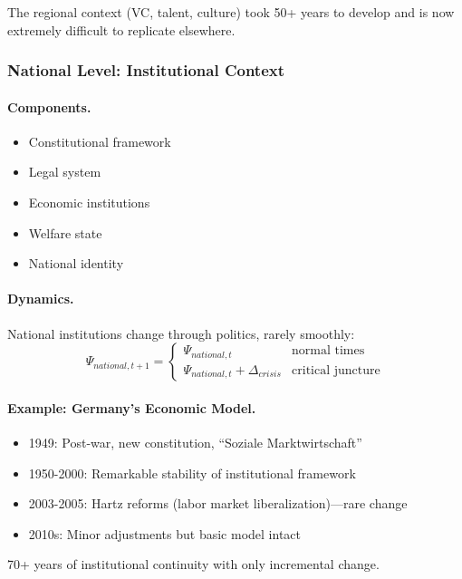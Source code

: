 \documentclass[12pt,a4paper]{article}
\begin{document}
The regional context (VC, talent, culture) took 50+ years to develop
and is now extremely difficult to replicate elsewhere.

\subsubsection{National Level: Institutional Context}

\paragraph{Components.}
\begin{itemize}
  \item Constitutional framework
  \item Legal system
  \item Economic institutions
  \item Welfare state
  \item National identity
\end{itemize}

\paragraph{Dynamics.}
National institutions change through politics, rarely smoothly:
\begin{equation}
  \Psi_{national, t+1} = \begin{cases}
    \Psi_{national, t} & \text{normal times} \\
    \Psi_{national, t} + \Delta_{crisis} & \text{critical juncture}
  \end{cases}
\end{equation}

\paragraph{Example: Germany's Economic Model.}
\begin{itemize}
  \item 1949: Post-war, new constitution, ``Soziale Marktwirtschaft''
  \item 1950-2000: Remarkable stability of institutional framework
  \item 2003-2005: Hartz reforms (labor market liberalization)---rare change
  \item 2010s: Minor adjustments but basic model intact
\end{itemize}

70+ years of institutional continuity with only incremental change.
\end{document}
